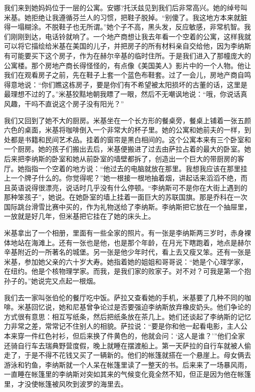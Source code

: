 我们来到她妈妈位于一层的公寓。安娜?托沃兹见到我们后非常高兴。她的绰号叫米基。她拒绝让我遵循芬兰人的习惯，把鞋子脱掉。“别傻了。我这地方本来就脏得一塌糊涂。不脱鞋子也无所谓。”她个子不高，黑头发，反应敏感，非常机智。我们刚刚到达，电话铃就响了。一个地产商想让我去年看一个空着的公寓，这样我就可以将它描绘给米基在美国的儿子，并把房子的所有材料亲自交给他，因为李纳斯有可能要买下这个房子，作为在赫尔辛基的临时住所。于是我们进入了那幢庞大的公寓楼。那个房地产商长得怪怪的，有点像《美国美人》影片中的一个人物。他让我们在观看房子之前，先在鞋子上套一个蓝色布鞋套。过了一会儿，房地产商自鸣得意地说：“你们瞧这栋房子，要是你们有不希望被太阳损坏的古董的话，这里是最理想不过的了。”米基狡黠地朝我瞟了一眼，然后不无嘲讽地说：“哦，你说话真风趣，干吗不直说这个房子没有阳光？”

我们又回到了她不大的厨房。米基坐在一个长方形的餐桌旁，餐桌上铺着一张五颜六色的桌面，米基将咖啡倒入一个非常大的杯子里。她的公寓和她前夫的一样，到处都是书籍和民间艺术品。挂着的窗帘是黑白相间的。这个公寓本来有三个卧室和一个厨房。她的孩子们搬出去后，米基便搬进了过去由萨拉占着的最大的卧室。她后来把李纳斯的卧室和她从前卧室的墙壁都拆了，创造出一个巨大的带厨房的客厅。她指指一个空着的地方说：“他过去的电脑就放在那里。我想我应该在那里挂上一个牌子什么的。你觉得呢？”她一根接一根地抽着烟，讲起话来滔滔不绝，而且英语说得很漂亮，说话时几乎没有什么停顿。“李纳斯可不是你在大街上遇到的那种笨孩子”，她说。在她卧室的墙上挂着一面巨大的苏联国旗。那是乔科在一次国际跳台滑雪比赛中买的，作为礼物送给了李纳斯。李纳斯把它放在一个抽屉里，一放就是好几年，但米基把它挂在了她的床头上。

米基拿出了一个相册，里面有一些全家的照片。有一张是李纳斯两三岁时，赤身裸体地站在海滩上。还有一张也是他，也是那个年龄，在月光下瞎跑着，地点是赫尔辛基附近的一所著名的城堡。另一张是他少年时代，看上去又瘦又笨。还有一张是米基，参加她父亲的六十岁大寿。她指着她的姐姐和哥哥说：“她是个心理学家，在纽约。他是个核物理学家。而我，是我们家的败家子。对不对？可我是第一个抱孙子的。”她说完又点起一根烟。

我们去一家叫张伯伦的餐厅吃中饭。萨拉又查看她的手机，米基要了几种不同的咖啡。米基回忆说，她和尼基曾争论过是否要强迫李纳斯放弃橡皮奶头。他们争论的方式很有意思：相互写纸条，然后把纸条放在茶几上。她们还谈起了李纳斯的记忆力非常之差，常常记不住别人的相貌。萨拉说：“要是你和他一起看电影，主人公本来穿一件红色衬衫，但后来换了件黄色的，他就会问：‘这人是谁？’”他们全家还骑自行车去瑞典野营度假，晚上就睡在摆渡船上。第一天萨拉的自行车就被人偷走了，于是不得不花钱又买了一辆新的。他们的帐篷就搭在一个悬崖上。母女俩去游泳和钓鱼，李纳斯就一个人呆在帐篷里读了一整天的书。后来来了一场暴风雨，一直睡在帐篷里的李纳斯对突如其来的气候变化竟全然不知，但正是因为他在帐篷里，才没使帐篷被风吹到波罗的海里去。

